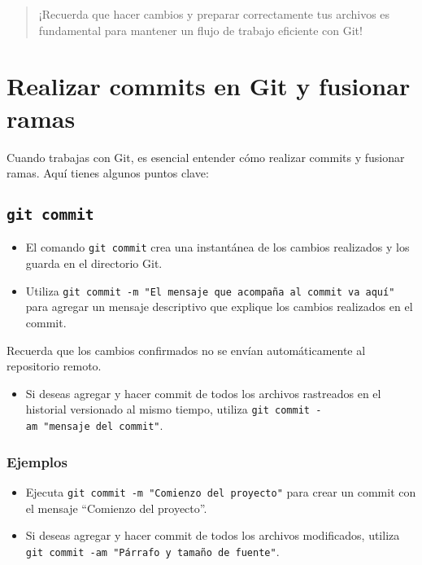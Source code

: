\documentclass[
  a4paper,
]{article}
\providecommand{\tightlist}{%
  \setlength{\itemsep}{0pt}\setlength{\parskip}{0pt}}\usepackage{longtable,booktabs,array}
\begin{document}
\begin{quote}
¡Recuerda que hacer cambios y preparar correctamente tus archivos es
fundamental para mantener un flujo de trabajo eficiente con Git!
\end{quote}

\section{Realizar commits en Git y fusionar
ramas}\label{realizar-commits-en-git-y-fusionar-ramas}

Cuando trabajas con Git, es esencial entender cómo realizar commits y
fusionar ramas. Aquí tienes algunos puntos clave:

\subsection{\texorpdfstring{\texttt{git\ commit}}{git commit}}\label{git-commit}

\begin{itemize}
\item
  El comando \texttt{git\ commit} crea una instantánea de los cambios
  realizados y los guarda en el directorio Git.
\item
  Utiliza
  \texttt{git\ commit\ -m\ "El\ mensaje\ que\ acompaña\ al\ commit\ va\ aquí"}
  para agregar un mensaje descriptivo que explique los cambios
  realizados en el commit.
\end{itemize}

Recuerda que los cambios confirmados no se envían automáticamente al
repositorio remoto.

\begin{itemize}
\tightlist
\item
  Si deseas agregar y hacer commit de todos los archivos rastreados en
  el historial versionado al mismo tiempo, utiliza
  \texttt{git\ commit\ -am\ "mensaje\ del\ commit"}.
\end{itemize}

\subsubsection{Ejemplos}\label{ejemplos-2}

\begin{itemize}
\item
  Ejecuta \texttt{git\ commit\ -m\ "Comienzo\ del\ proyecto"} para crear
  un commit con el mensaje ``Comienzo del proyecto''.
\item
  Si deseas agregar y hacer commit de todos los archivos modificados,
  utiliza \texttt{git\ commit\ -am\ "Párrafo\ y\ tamaño\ de\ fuente"}.
\end{itemize}
\end{document}
